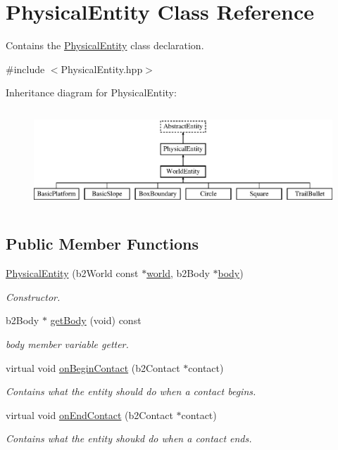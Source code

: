 \hypertarget{class_physical_entity}{}\section{Physical\+Entity Class Reference}
\label{class_physical_entity}


Contains the \hyperlink{class_physical_entity}{Physical\+Entity} class declaration.  




{\ttfamily \#include $<$Physical\+Entity.\+hpp$>$}

Inheritance diagram for Physical\+Entity\+:\begin{figure}[H]
\begin{center}
\leavevmode
\includegraphics[height=3.771044cm]{class_physical_entity}
\end{center}
\end{figure}
\subsection*{Public Member Functions}
\begin{DoxyCompactItemize}
\item 
\hyperlink{class_physical_entity_a7e10473f085a0032f0d9c6b17641c777}{Physical\+Entity} (b2\+World const $\ast$\hyperlink{class_physical_entity_ae6c23c3817c4d7f9a867abed05cd7834}{world}, b2\+Body $\ast$\hyperlink{class_physical_entity_a91a5016393dd890c490b329abd938ec7}{body})
\begin{DoxyCompactList}\small\item\em Constructor. \end{DoxyCompactList}\item 
b2\+Body $\ast$ \hyperlink{class_physical_entity_aaf3369e0c6147c0280a3abca28a75e96}{get\+Body} (void) const 
\begin{DoxyCompactList}\small\item\em body member variable getter. \end{DoxyCompactList}\item 
virtual void \hyperlink{class_physical_entity_a61e9f273e51f5855ca0bf7bb842c738d}{on\+Begin\+Contact} (b2\+Contact $\ast$contact)
\begin{DoxyCompactList}\small\item\em Contains what the entity should do when a contact begins. \end{DoxyCompactList}\item 
virtual void \hyperlink{class_physical_entity_ae2a98ad512ba0169dcca7bb5b4223306}{on\+End\+Contact} (b2\+Contact $\ast$contact)
\begin{DoxyCompactList}\small\item\em Contains what the entity shoukd do when a contact ends. \end{DoxyCompactList}\end{DoxyCompactItemize}
